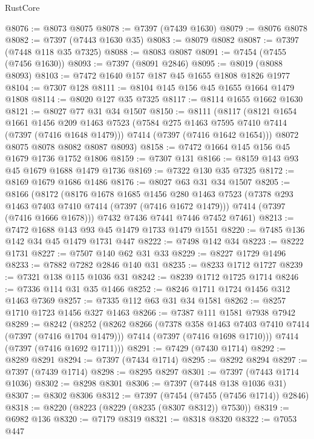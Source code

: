 \begin{lexlean}{RustCore}
\begin{coremodule}
@8076 := @8073 @8075
@8078 := @7397 (@7439 @1630)
@8079 := @8076 @8078
@8082 := @7397 (@7443 @1630 @35)
@8083 := @8079 @8082
@8087 := @7397 (@7448 @118 @35 @7325)
@8088 := @8083 @8087
@8091 := @7454 (@7455 (@7456 @1630))
@8093 := @7397 (@8091 @2846)
@8095 := @8019 (@8088 @8093)
@8103 := @7472 @1640 @157 @187 @45 @1655 @1808 @1826 @1977
@8104 := @7307 @128
@8111 := @8104 @145 @156 @45 @1655 @1664 @1479 @1808
@8114 := @8020 @127 @35 @7325
@8117 := @8114 @1655 @1662 @1630
@8121 := @8027 @77 @31 @34 @1507
@8150 := @8111
    (@8117
      (@8121
        @1654
        @1661
        @1456
        @209
        @1463
        @7523
        (@7584 @275 @1463 @7595 @7410 @7414 (@7397 (@7416 @1648 @1479)))
        @7414
        (@7397 (@7416 @1642 @1654)))
      @8072
      @8075
      @8078
      @8082
      @8087
      @8093)
@8158 := @7472 @1664 @145 @156 @45 @1679 @1736 @1752 @1806
@8159 := @7307 @131
@8166 := @8159 @143 @93 @45 @1679 @1688 @1479 @1736
@8169 := @7322 @130 @35 @7325
@8172 := @8169 @1679 @1686 @1486
@8176 := @8027 @63 @31 @34 @1507
@8205 := @8166
    (@8172
      (@8176
        @1678
        @1685
        @1456
        @280
        @1463
        @7523
        (@7378 @293 @1463 @7403 @7410 @7414 (@7397 (@7416 @1672 @1479)))
        @7414
        (@7397 (@7416 @1666 @1678)))
      @7432
      @7436
      @7441
      @7446
      @7452
      @7461)
@8213 := @7472 @1688 @143 @93 @45 @1479 @1733 @1479 @1551
@8220 := @7485 @136 @142 @34 @45 @1479 @1731 @447
@8222 := @7498 @142 @34
@8223 := @8222 @1731
@8227 := @7507 @140 @62 @31 @33
@8229 := @8227 @1729 @1496
@8233 := @7882 @7282 @2846 @140 @31
@8235 := @8233 @1712 @1727
@8239 := @7321 @138 @115 @1036 @31
@8242 := @8239 @1712 @1725 @1714
@8246 := @7336 @114 @31 @35 @1466
@8252 := @8246 @1711 @1724 @1456 @312 @1463 @7369
@8257 := @7335 @112 @63 @31 @34 @1581
@8262 := @8257 @1710 @1723 @1456 @327 @1463
@8266 := @7387 @111 @1581 @7938 @7942
@8289 := @8242
    (@8252
      (@8262
        @8266
        (@7378 @358 @1463 @7403 @7410 @7414 (@7397 (@7416 @1704 @1479)))
        @7414
        (@7397 (@7416 @1698 @1710)))
      @7414
      (@7397 (@7416 @1692 @1711)))
@8291 := @7429 (@7430 @1714)
@8292 := @8289 @8291
@8294 := @7397 (@7434 @1714)
@8295 := @8292 @8294
@8297 := @7397 (@7439 @1714)
@8298 := @8295 @8297
@8301 := @7397 (@7443 @1714 @1036)
@8302 := @8298 @8301
@8306 := @7397 (@7448 @138 @1036 @31)
@8307 := @8302 @8306
@8312 := @7397 (@7454 (@7455 (@7456 @1714)) @2846)
@8318 := @8220 (@8223 (@8229 (@8235 (@8307 @8312)) @7530))
@8319 := @6982 @136
@8320 := @7179 @8319
@8321 := @8318 @8320
@8322 := @7053 @447

\end{coremodule}
\end{lexlean}
